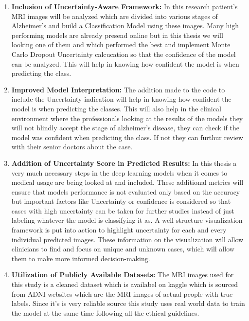 \documentclass[12pt,onecolumn]{report}
\begin{document}
\begin{enumerate}
    \item \textbf{ Inclusion of Uncertainty-Aware Framework:} In this research patient's MRI images will be analyzed which are divided into various stages of Alzheimer's and build a Classification Model using these images. Many high performing models are already presend online but in this thesis we will looking one of them and which performed the best and implement Monte Carlo Dropout Uncertainty calcucation so that the confidence of the model can be analyzed. This will help in knowing how confident the model is when predicting the class.

    \item  \textbf{ Improved Model Interpretation:} The addition made to the code to include the Uncertainty indication will help in knowing how confident the model is when predicting the classes. This will also help in the clinical environment where the professionals looking at the results of the models they will not blindly accept the stage of alzheimer's disease, they can check if the model was confident when predicting the class. If not they can furthur review with their senior doctors about the case.

    \item \textbf{ Addition of Uncertainty Score in Predicted Results:}
    In this thesis a very much necessary steps in the deep learning models when it comes to medical usage are being looked at and included. These additional metrics will ensure that models performance is not evaluated only based on the accuracy but important factors like Uncertainty or confidence is considered so that cases with high uncertainty can be taken for further studies instead of just labeling whatever the model is classifying it as. A well structure visualization framework is put into action to highlight uncertainty for each and every individual predicted images. These information on the visualization will allow clinicians to find and focus on unique and unknown cases, which will allow them to make more informed decision-making.
    

    \item \textbf{Utilization of Publicly Available Datasets:} The MRI images used for this study is a cleaned dataset which is availabel on kaggle which is sourced from ADNI websites which are the MRI images of actual people with true labels. Since it's is very reliable source this study uses real world data to train the model at the same time following all the ethical guidelines.
    

\end{enumerate}
\end{document}
